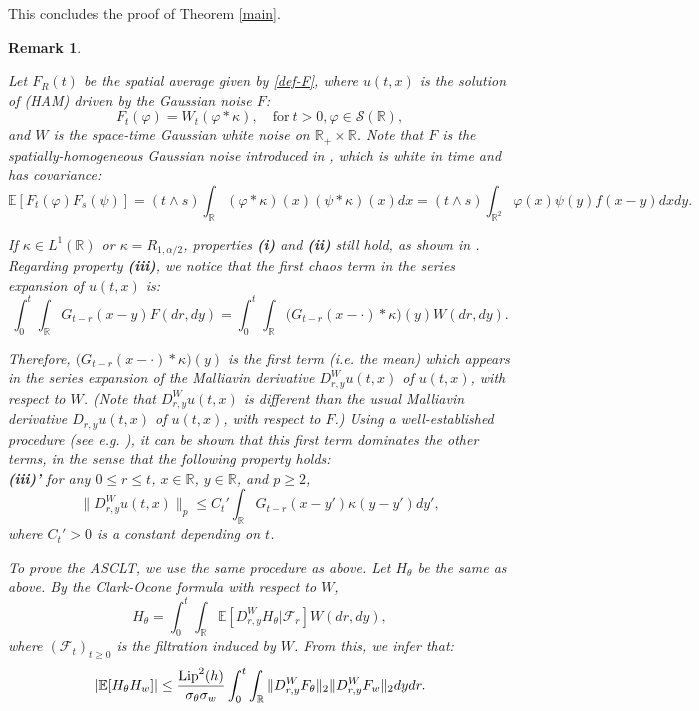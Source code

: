 \documentclass[12pt]{article}
\newtheorem{remark}[theorem]{Remark}
\def\cF{\mathcal{F}}
\def\cS{\mathcal{S}}
\def\bE{\mathbb{E}}
\def\bR{\mathbb{R}}
\newcommand{\lipf}{h}
\newcommand{\kerf}{f}
\begin{document}
This concludes the proof of Theorem \ref{main}.

\bigskip

\begin{remark}
\label{Gaussian}
{\rm Let $F_R(t)$ be the spatial average given by \eqref{def-F}, where $u(t,x)$ is the solution of (HAM) driven by the Gaussian noise $F$:
\[
F_t(\varphi)=W_t(\varphi* \kappa), \quad \mbox{for} \ t>0,\varphi \in \cS(\bR),
\]
and $W$ is the space-time Gaussian white noise on $\bR_{+}\times \bR$. Note that $F$ is the spatially-homogeneous Gaussian noise introduced in \cite{dalang99}, which is white in time and has covariance:
\[
\bE[F_t(\varphi)F_s(\psi)]=(t \wedge s)\int_{\bR}(\varphi* \kappa)(x)(\psi *\kappa)(x)dx= (t \wedge s)\int_{\bR^2}\varphi(x)\psi(y)\kerf(x-y)dxdy. 
\]

If $\kappa \in L^1(\bR)$ or $\kappa=R_{1,\alpha/2}$, properties {\bf (i)} and {\bf (ii)} still hold, as shown in \cite{DNZ20}.
Regarding property {\bf (iii)}, we notice that the first chaos term in the series expansion of $u(t,x)$ is:
\[
\int_0^t \int_{\bR}G_{t-r}(x-y)F(dr,dy)=\int_0^t \int_{\bR} \big(G_{t-r}(x-\cdot) * \kappa\big)(y)W(dr,dy).
\]

Therefore, $\big(G_{t-r}(x-\cdot) * \kappa\big)(y)$ is the first term (i.e. the mean) which appears in the series expansion of the Malliavin derivative $D_{r,y}^{W}u(t,x)$ of $u(t,x)$, {\em with respect to $W$}. (Note that $D_{r,y}^{W}u(t,x)$ is different than the usual Malliavin derivative $D_{r,y}u(t,x)$ of $u(t,x)$, with respect to $F$.) Using a well-established procedure (see e.g. \cite{DNZ20}), it can be shown that this first term dominates the other terms, in the sense that the following property holds:\\
{\bf (iii)'} for any $0\leq r\leq t$, $x \in \bR$, $y \in \bR$, and $p\geq 2$,
\[
\|D_{r,y}^Wu(t,x)\|_p \leq C_t' \int_{\bR}G_{t-r}(x-y')\kappa(y-y')dy',
\]
where $C_t'>0$ is a constant depending on $t$.

\medskip


To prove the ASCLT, we use the same procedure as above. Let $H_{\theta}$ be the same as above. By the Clark-Ocone formula with respect to $W$,
\[
H_{\theta}=\int_0^t \int_{\bR}\bE[D_{r,y}^W H_{\theta}|\cF_r]W(dr,dy),
\]
where $(\cF_t)_{t\geq 0}$ is the filtration induced by $W$. From this, we infer that:
\begin{equation}
\label{H-tw1}
|\bE[H_{\theta} H_{w}]| \leq \frac{{\rm Lip}^2(\lipf)}{\sigma_{\theta} \sigma_{w}} \int_0^t \int_{\bR} \|D_{r,y}^W F_{\theta}\|_2 \|D_{r,y}^W F_{w}\|_2 dydr.
\end{equation}

}
\end{remark}
\end{document}
